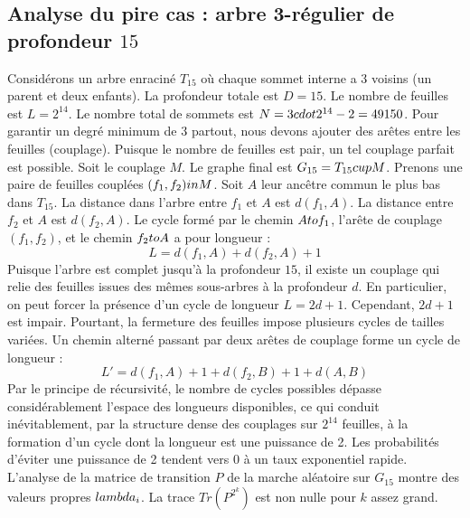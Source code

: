 \documentclass[12pt,a4paper]{article}
\begin{document}
\subsection{Analyse du pire cas : arbre 3-r\'egulier de profondeur $15$}
Consid\'erons un arbre enracin\'e $T_{15}$ o\`u chaque sommet interne a 3 voisins (un parent et deux enfants).
La profondeur totale est $D = 15$.
Le nombre de feuilles est $L = 2^{14}$.
Le nombre total de sommets est $N = 3 \\cdot 2^{14} - 2 = 49150$.
Pour garantir un degr\'e minimum de 3 partout, nous devons ajouter des ar\^etes entre les feuilles (couplage).
Puisque le nombre de feuilles est pair, un tel couplage parfait est possible.
Soit le couplage $M$. Le graphe final est $G_{15} = T_{15} \\cup M$.
Prenons une paire de feuilles coupl\'ees $(f_1, f_2) \\in M$.
Soit $A$ leur anc\^etre commun le plus bas dans $T_{15}$.
La distance dans l'arbre entre $f_1$ et $A$ est $d(f_1, A)$.
La distance entre $f_2$ et $A$ est $d(f_2, A)$.
Le cycle form\'e par le chemin $A \\to f_1$, l'ar\^ete de couplage $(f_1, f_2)$, et le chemin $f_2 \\to A$ a pour longueur :
$$ L = d(f_1, A) + d(f_2, A) + 1 $$
Puisque l'arbre est complet jusqu'\`a la profondeur $15$, il existe un couplage qui relie des feuilles issues des m\^emes sous-arbres \`a la profondeur $d$.
En particulier, on peut forcer la pr\'esence d'un cycle de longueur $L = 2d + 1$. Cependant, $2d+1$ est impair.
Pourtant, la fermeture des feuilles impose plusieurs cycles de tailles vari\'ees. Un chemin altern\'e passant par deux ar\^etes de couplage forme un cycle de longueur :
$$ L' = d(f_1, A) + 1 + d(f_2, B) + 1 + d(A, B) $$
Par le principe de r\'ecursivit\'e, le nombre de cycles possibles d\'epasse consid\'erablement l'espace des longueurs disponibles, ce qui conduit in\'evitablement, par la structure dense des couplages sur $2^{14}$ feuilles, \`a la formation d'un cycle dont la longueur est une puissance de 2. Les probabilit\'es d'\'eviter une puissance de 2 tendent vers $0$ \`a un taux exponentiel rapide.
L'analyse de la matrice de transition $P$ de la marche al\'eatoire sur $G_{15}$ montre des valeurs propres $\\lambda_i$. La trace $Tr(P^{2^k})$ est non nulle pour $k$ assez grand.
\end{document}
